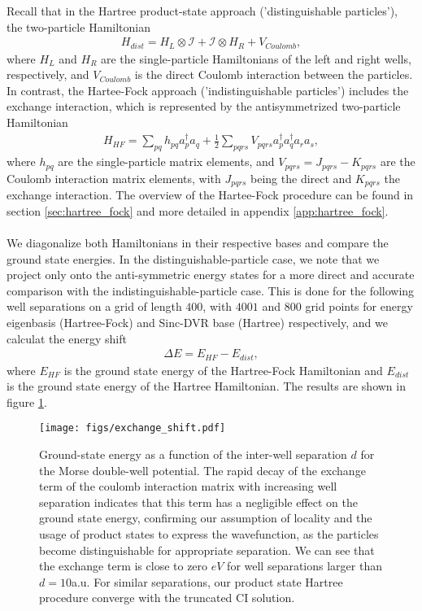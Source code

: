 \documentclass{subfiles}
\begin{document}
Recall that in the Hartree product-state approach ('distinguishable particles'), the two-particle Hamiltonian
\begin{align*}
    H_{dist} = H_L \otimes \mathcal{I} + \mathcal{I} \otimes H_R + V_{Coulomb},
\end{align*}
where $H_L$ and $H_R$ are the single-particle Hamiltonians of the left and right wells, respectively, and $V_{Coulomb}$ is the direct Coulomb interaction between the particles. In contrast, the Hartee-Fock approach ('indistinguishable particles') includes the exchange interaction, which is represented by the antisymmetrized two-particle Hamiltonian
\begin{align*}
    H_{HF} = \sum_{pq} h_{pq} a_p^\dagger a_q + \frac{1}{2} \sum_{pqrs} V_{pqrs} a_p^\dagger a_q^\dagger a_r a_s,
\end{align*}
where $h_{pq}$ are the single-particle matrix elements, and $V_{pqrs} = J_{pqrs} - K_{pqrs}$ are the Coulomb interaction matrix elements, with $J_{pqrs}$ being the direct and $K_{pqrs}$ the exchange interaction. The overview of the Hartee-Fock procedure can be found in section \ref{sec:hartree_fock} and more detailed in appendix \ref{app:hartree_fock}. \\\\
We diagonalize both Hamiltonians in their respective bases and compare the ground state energies. In the distinguishable-particle case, we note that we project only onto the anti-symmetric energy states for a more direct and accurate comparison with the indistinguishable-particle case. This is done for the following well separations on a grid of length $400$, with $4001$ and $800$ grid points for energy eigenbasis (Hartree-Fock) and Sinc-DVR base (Hartree) respectively, and we calculat the energy shift
\begin{align*}
    \Delta E = E_{HF} - E_{dist},
\end{align*}
where $E_{HF}$ is the ground state energy of the Hartree-Fock Hamiltonian and $E_{dist}$ is the ground state energy of the Hartree Hamiltonian. The results are shown in figure \ref{fig:exchange_shift}. 
\begin{figure}[h!]
    \centering
    \texttt{[image: figs/exchange\_shift.pdf]}
    \caption{Ground-state energy as a function of the inter-well separation $d$ for the Morse double-well potential. The rapid decay of the exchange term of the coulomb interaction matrix with increasing well separation indicates that this term has a negligible effect on the ground state energy, confirming our assumption of locality and the usage of product states to express the wavefunction, as the particles become distinguishable for appropriate separation. We can see that the exchange term is close to zero $eV$ for well separations larger than $d = 10$a.u. For similar separations, our product state Hartree procedure converge with the truncated CI solution. }
    \label{fig:exchange_shift}
\end{figure}
\end{document}
